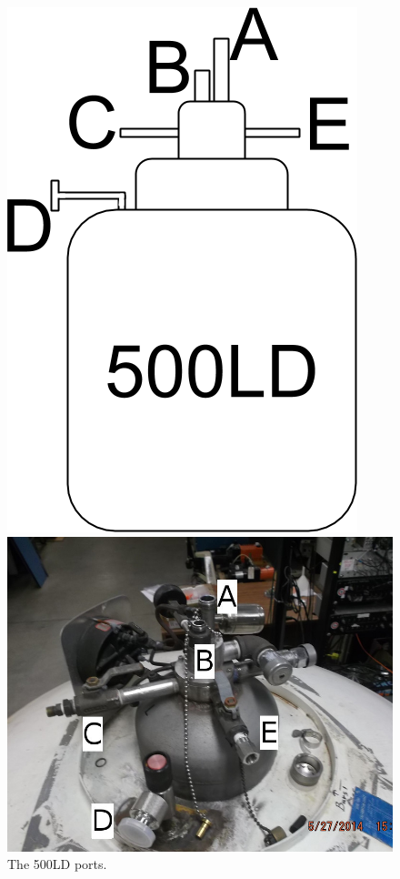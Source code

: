 \begin{figure}[h]
 \centering
 \begin{minipage}{.35\textwidth}
 \includegraphics[width=\textwidth]{./img/500LD-cartoon.png}
 \caption{The 500LD ports.}
 \label{fig:500LD-cartoon}
 \end{minipage}
 \quad
  \begin{minipage}{.50\textwidth}
 \includegraphics[width=\textwidth]{./img/500LD-photo.jpg}

\end{minipage}
\end{figure}

